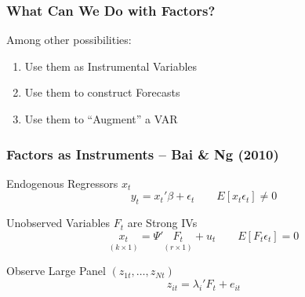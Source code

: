 \documentclass[handout]{beamer}
\begin{document}
\begin{frame}
\frametitle{What Can We Do with Factors?}

Among other possibilities:
\begin{enumerate}
	\item Use them as Instrumental Variables 
	\item Use them to construct Forecasts
	\item Use them to ``Augment'' a VAR
\end{enumerate}

\end{frame}

\begin{frame}[c]\frametitle{Factors as Instruments -- Bai \& Ng (2010)}
\begin{block}
   	{Endogenous Regressors $x_t$}
$$y_t = x_t' \beta + \epsilon_t \quad \quad E[x_t\epsilon_t] \neq 0 $$
\end{block}   

 \begin{block}
 	{Unobserved Variables $F_t$ are Strong IVs}
$$\underset{(k\times 1)}{x_t} = \Psi'\underset{(r\times 1)}{F_t} + u_t \quad \quad E[F_t \epsilon_t] = 0$$
 \end{block}

\begin{block}
	{Observe Large Panel $(z_{1t}, \hdots, z_{Nt})$}
		$$z_{it} = \lambda_i' F_t + e_{it}$$
\end{block}

\end{frame}

\end{document}
